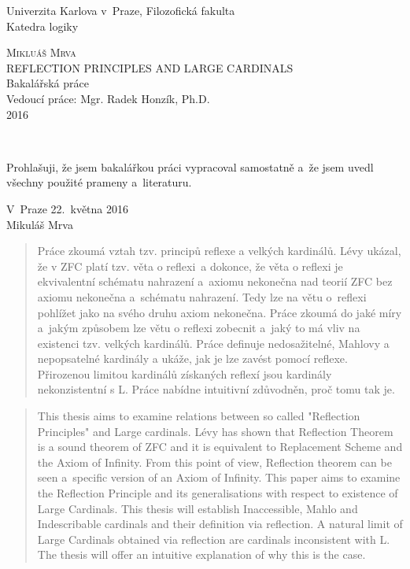 \documentclass[12pt,a4paper]{article}
\begin{document}
\begin{titlepage}
\Large
\begin{center}
Univerzita Karlova v~Praze, Filozofick{\/á} fakulta\\
Katedra logiky

\vspace{8.5em}
\textsc{Mikluáš Mrva}\\[1.4em]
{REFLECTION PRINCIPLES AND LARGE CARDINALS}\\
Bakalářská práce\\[6.8em]
Vedoucí práce: Mgr. Radek Honzík, Ph.D.\\[6.8em]
2016
\end{center}
\end{titlepage}\





\vspace{\fill}
\noindent 
Prohlašuji, že jsem bakalářkou práci vypracoval samostatně a~že jsem uvedl všechny použité prameny a~literaturu.

\bigskip
\noindent V~Praze 22.~května 2016\\[3em]
\hspace*{\fill}Mikuláš Mrva\hspace*{3em}
\clearpage

\begin{abstract}
\noindent Práce zkoumá vztah tzv. principů reflexe a velkých kardinálů. Lévy ukázal, že v ZFC platí tzv. věta o reflexi~a dokonce, že věta o reflexi je ekvivalentní schématu nahrazení a~axiomu nekonečna nad teorií ZFC bez axiomu nekonečna a~schématu nahrazení. Tedy lze na větu o~reflexi pohlížet jako na svého druhu axiom nekonečna. Práce zkoumá do jaké míry a~jakým způsobem lze větu o reflexi zobecnit a~jaký to má vliv na existenci tzv. velkých kardinálů. Práce definuje nedosažitelné, Mahlovy a nepopsatelné kardinály a ukáže, jak je lze zavést pomocí reflexe. Přirozenou limitou kardinálů získaných reflexí jsou kardinály nekonzistentní s L. Práce nabídne intuitivní zdůvodněn, proč tomu tak je.

\end{abstract}
\bigskip
\renewcommand{\abstractname}{Abstract}
\begin{abstract}
\noindent This thesis aims to examine relations between so called "Reflection Principles" and Large cardinals. Lévy has shown that Reflection Theorem is a sound theorem of ZFC and it is equivalent to Replacement Scheme and the Axiom of Infinity. From this point of view, Reflection theorem can be seen a~specific version of an Axiom of Infinity. This paper aims to examine the Reflection Principle and its generalisations with respect to existence of Large Cardinals. This thesis will establish Inaccessible, Mahlo and Indescribable cardinals and their definition via reflection. A natural limit of Large Cardinals obtained via reflection are cardinals inconsistent with L. The thesis will offer an intuitive explanation of why this is the case.
\end{abstract}
\clearpage
\end{document}
